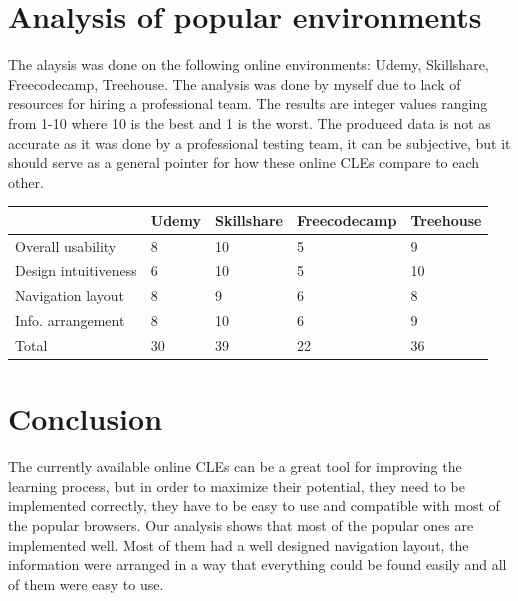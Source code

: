 \documentclass[10pt,english,a4paper]{article}
\begin{document}
\section{Analysis of popular environments}\label{analysis}
The alaysis was done on the following online environments: Udemy, Skillshare, Freecodecamp, Treehouse.
The analysis was done by myself due to lack of resources for hiring a professional team. The results are integer values
ranging from 1-10 where 10 is the best and 1 is the worst. The produced data is not as accurate as it was done
by a professional testing team, it can be subjective, but it should serve as a general pointer for
how these online CLEs compare to each other.



    \begin{table}
        \begin{center}
    \begin{tabular}{|l|l|l|l|l|}
    \hline
    \setlength\tabcolsep{1pt}
                                    & \textbf{Udemy} & \textbf{Skillshare} & \textbf{Freecodecamp} & \textbf{Treehouse} \\ \hline
    \small{Overall usability}       & 8              & 10                  & 5                     & 9                  \\ \hline
    \small{Design intuitiveness}    & 6              & 10                  & 5                     & 10                 \\ \hline
    \small{Navigation layout}       & 8              & 9                   & 6                     & 8                  \\ \hline
    \small{Info. arrangement}       & 8              & 10                  & 6                     & 9                  \\ \hline
    Total                                  & 30             & 39                  & 22                    & 36                 \\ \hline
    \end{tabular}
\end{center}
\end{table}



\section{Conclusion}
The currently available online CLEs can be a great tool for improving the learning process, but in order
to maximize their potential, they need to be implemented correctly, they have to be easy to use and compatible 
with most of the popular browsers. Our analysis shows that most of the popular ones are
implemented well. Most of them had a well designed navigation layout, the information were arranged
in a way that everything could be found easily and all of them were easy to use.   
\end{document}
